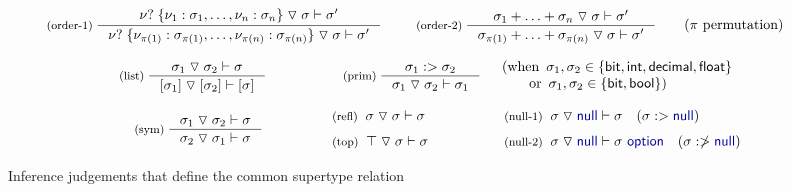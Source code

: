 \documentclass[preprint]{sigplanconf}
\newcommand{\kvd}[1]{\textnormal{\textcolor{kvdclr}{\sffamily #1}}}
\newcommand{\ident}[1]{\textnormal{\sffamily #1}}
\newcommand{\tsep}[0]{\; \triangledown \;}
\begin{document}
\begin{figure}[t]
\begin{equation*}
\hspace{1em}
\inference[(order-1)\;]
  { \nu? \; \{ \nu_1 : \sigma_1, \ldots, \nu_n : \sigma_n \} \tsep \sigma \vdash \sigma' }
  { \nu? \; \{ \nu_{\pi(1)} : \sigma_{\pi(1)}, \ldots, \nu_{\pi(n)} : \sigma_{\pi(n)} \} \tsep \sigma \vdash \sigma' }
\quad
\inference[(order-2)\;]
  { \sigma_1 + \ldots + \sigma_n \tsep \sigma \vdash \sigma' }
  { \sigma_{\pi(1)} + \ldots + \sigma_{\pi(n)} \tsep \sigma \vdash \sigma' }
\qquad (\pi~\textnormal{permutation})  
\end{equation*}

\begin{equation*}
\hspace{3em}
\inference[(list)\;]
  {\sigma_1 \tsep \sigma_2 \vdash \sigma}
  {[\sigma_1] \tsep [\sigma_2] \vdash [\sigma]}
\qquad\qquad
\inference[(prim)\;]
  {\sigma_1 :> \sigma_2}
  {\sigma_1 \tsep \sigma_2 \vdash \sigma_1}\quad
\begin{array}{l}
  (\textnormal{when}\,~\sigma_1, \sigma_2 \in \{\ident{bit}, \ident{int}, \ident{decimal}, \ident{float} \} \\
   \quad~~\;\textnormal{or}\,~\sigma_1, \sigma_2 \in \{\ident{bit}, \ident{bool} \})
\end{array}   
\end{equation*}

\noindent
\begin{equation*}
\hspace{4.75em}
\inference[(sym)\;]
  {\sigma_1 \tsep \sigma_2 \vdash \sigma}
  {\sigma_2 \tsep \sigma_1 \vdash \sigma}
%
\qquad\quad
\begin{array}{l}
 \textnormal{\footnotesize{(refl)}}\;\; \sigma \tsep \sigma \vdash \sigma\\[0.6em]
 \textnormal{\footnotesize{(top)}}\;\; \top \tsep \sigma \vdash \sigma
\end{array}
%
\qquad\quad 
 \begin{array}{l}
 \textnormal{\footnotesize{(null-1)}}\;\; \sigma \tsep \kvd{null} \vdash \sigma \quad(\sigma :> \kvd{null}) \\[0.6em]
 \textnormal{\footnotesize{(null-2)}}\;\; \sigma \tsep \kvd{null} \vdash \sigma~\kvd{option} \quad(\sigma :\ngtr \kvd{null})
 \end{array}
\end{equation*}

\caption{Inference judgements that define the common supertype relation}
\label{fig:subtyping-cst}
\end{figure}
\end{document}
